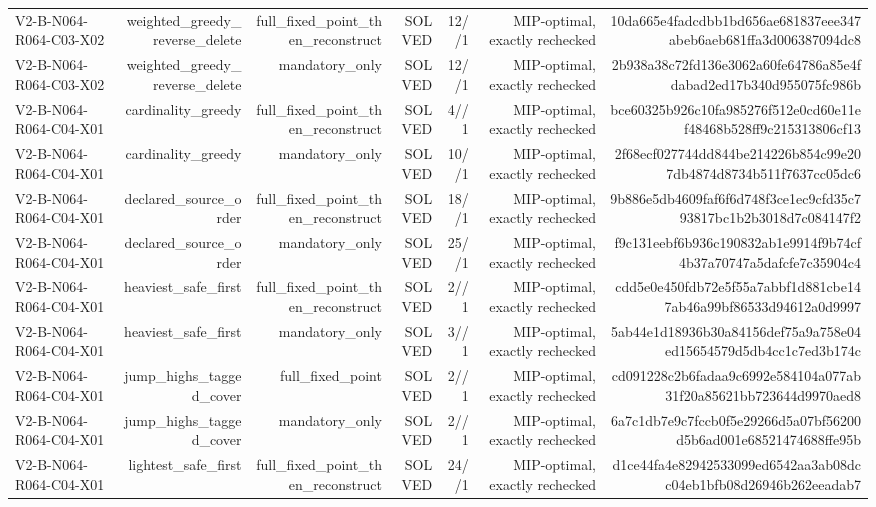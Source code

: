 {\begin{longtable}{lrrrrrr}
V2-B-N064-R064-C03-X02 & weighted\_greedy\_reverse\_delete & full\_fixed\_point\_then\_reconstruct & SOLVED & 12//1 & MIP-optimal, exactly rechecked & 10da665e4fadcdbb1bd656ae681837eee347abeb6aeb681ffa3d006387094dc8 \\
V2-B-N064-R064-C03-X02 & weighted\_greedy\_reverse\_delete & mandatory\_only & SOLVED & 12//1 & MIP-optimal, exactly rechecked & 2b938a38c72fd136e3062a60fe64786a85e4fdabad2ed17b340d955075fc986b \\
V2-B-N064-R064-C04-X01 & cardinality\_greedy & full\_fixed\_point\_then\_reconstruct & SOLVED & 4//1 & MIP-optimal, exactly rechecked & bce60325b926c10fa985276f512e0cd60e11ef48468b528ff9c215313806cf13 \\
V2-B-N064-R064-C04-X01 & cardinality\_greedy & mandatory\_only & SOLVED & 10//1 & MIP-optimal, exactly rechecked & 2f68ecf027744dd844be214226b854c99e207db4874d8734b511f7637cc05dc6 \\
V2-B-N064-R064-C04-X01 & declared\_source\_order & full\_fixed\_point\_then\_reconstruct & SOLVED & 18//1 & MIP-optimal, exactly rechecked & 9b886e5db4609faf6f6d748f3ce1ec9cfd35c793817bc1b2b3018d7c084147f2 \\
V2-B-N064-R064-C04-X01 & declared\_source\_order & mandatory\_only & SOLVED & 25//1 & MIP-optimal, exactly rechecked & f9c131eebf6b936c190832ab1e9914f9b74cf4b37a70747a5dafcfe7c35904c4 \\
V2-B-N064-R064-C04-X01 & heaviest\_safe\_first & full\_fixed\_point\_then\_reconstruct & SOLVED & 2//1 & MIP-optimal, exactly rechecked & cdd5e0e450fdb72e5f55a7abbf1d881cbe147ab46a99bf86533d94612a0d9997 \\
V2-B-N064-R064-C04-X01 & heaviest\_safe\_first & mandatory\_only & SOLVED & 3//1 & MIP-optimal, exactly rechecked & 5ab44e1d18936b30a84156def75a9a758e04ed15654579d5db4cc1c7ed3b174c \\
V2-B-N064-R064-C04-X01 & jump\_highs\_tagged\_cover & full\_fixed\_point & SOLVED & 2//1 & MIP-optimal, exactly rechecked & cd091228c2b6fadaa9c6992e584104a077ab31f20a85621bb723644d9970aed8 \\
V2-B-N064-R064-C04-X01 & jump\_highs\_tagged\_cover & mandatory\_only & SOLVED & 2//1 & MIP-optimal, exactly rechecked & 6a7c1db7e9c7fccb0f5e29266d5a07bf56200d5b6ad001e68521474688ffe95b \\
V2-B-N064-R064-C04-X01 & lightest\_safe\_first & full\_fixed\_point\_then\_reconstruct & SOLVED & 24//1 & MIP-optimal, exactly rechecked & d1ce44fa4e82942533099ed6542aa3ab08dcc04eb1bfb08d26946b262eeadab7 \\

\end{longtable}}
